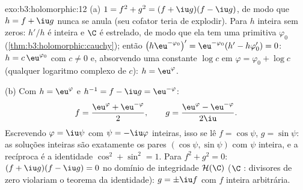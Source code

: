 \begin{solution}{exo:b3:holomorphic:12}
(a) $1 = f^2 + g^2 = (f + \iu g)(f - \iu g)$, de modo que $h = f +
\iu g$ nunca se anula (seu cofator teria de explodir).
Para $h$ inteira sem zeros: $h'/h$ é inteira e $\C$ é
estrelado, de modo que ela tem uma primitiva $\varphi_0$
(\cref{thm:b3:holomorphic:cauchy}); então
$\bigl(h\eu^{-\varphi_0}\bigr)' = \eu^{-\varphi_0}(h' -
h\varphi_0') = 0$: $h = c\,\eu^{\varphi_0}$ com $c \neq 0$
e, absorvendo uma constante $\log c$ em $\varphi = \varphi_0
+ \log c$ (qualquer logaritmo complexo de $c$): $h =
\eu^{\varphi}$.

(b) Com $h = \eu^{\varphi}$ e $h^{-1} = f - \iu g =
\eu^{-\varphi}$:
\[
f = \frac{\eu^{\varphi} + \eu^{-\varphi}}2,
\qquad
g = \frac{\eu^{\varphi} - \eu^{-\varphi}}{2\iu} .
\]
Escrevendo $\varphi = \iu\psi$ com $\psi = -\iu\varphi$
inteiras, isso se lê $f = \cos\psi$, $g = \sin\psi$: as
soluções inteiras são exatamente os pares $(\cos\psi,
\sin\psi)$ com $\psi$ inteira, e a recíproca é a
identidade $\cos^2 + \sin^2 = 1$.
Para $f^2 + g^2 = 0$: $(f + \iu g)(f - \iu g) = 0$ no
domínio de integridade $\mathcal H(\C)$ ($\C$ :
divisores de zero violariam o teorema da identidade): $g = \pm\iu
f$ com $f$ inteira arbitrária.
\end{solution}

